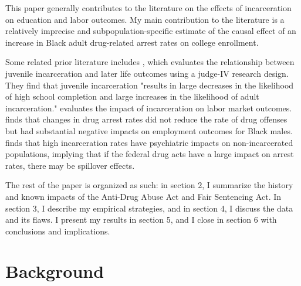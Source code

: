 \documentclass{article}
\begin{document}
This paper generally contributes to the literature on the effects of incarceration on education and labor outcomes. My main contribution to the literature is a relatively imprecise and subpopulation-specific estimate of the causal effect of an increase in Black adult drug-related arrest rates on college enrollment.

Some related prior literature includes \cite{aizer}, which evaluates the relationship between juvenile incarceration and later life outcomes using a judge-IV research design. They find that juvenile incarceration "results in large decreases in the likelihood of high school completion and large increases in the likelihood of adult incarceration." \cite{western} evaluates the impact of incarceration on labor market outcomes. \cite{mitchell2016effect} finds that changes in drug arrest rates did not reduce the rate of drug offenses but had substantial negative impacts on employment outcomes for Black males. \cite{hatzenbuehler2015collateral} finds that high incarceration rates have psychiatric impacts on non-incarcerated populations, implying that if the federal drug acts have a large impact on arrest rates, there may be spillover effects.

The rest of the paper is organized as such: in section 2, I summarize the history and known impacts of the Anti-Drug Abuse Act and Fair Sentencing Act. In section 3, I describe my empirical strategies, and in section 4, I discuss the data and its flaws. I present my results in section 5, and I close in section 6 with conclusions and implications.

\section{Background}
\end{document}
